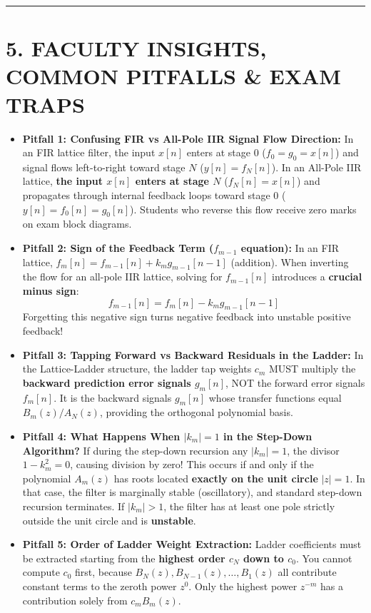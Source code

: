 \documentclass[11pt,a4paper]{article}
\begin{document}
\noindent\rule{\textwidth}{0.5pt}

\section{5. FACULTY INSIGHTS, COMMON PITFALLS \& EXAM TRAPS}

\begin{itemize}
    \item \textbf{Pitfall 1: Confusing FIR vs All-Pole IIR Signal Flow Direction:}
    In an FIR lattice filter, the input $x[n]$ enters at stage 0 ($f_0 = g_0 = x[n]$) and signal flows left-to-right toward stage $N$ ($y[n] = f_N[n]$). In an All-Pole IIR lattice, \textbf{the input $x[n]$ enters at stage $N$} ($f_N[n] = x[n]$) and propagates through internal feedback loops toward stage 0 ($y[n] = f_0[n] = g_0[n]$). Students who reverse this flow receive zero marks on exam block diagrams.
    
    \item \textbf{Pitfall 2: Sign of the Feedback Term ($f_{m-1}$ equation):}
    In an FIR lattice, $f_m[n] = f_{m-1}[n] + k_m g_{m-1}[n-1]$ (addition). When inverting the flow for an all-pole IIR lattice, solving for $f_{m-1}[n]$ introduces a \textbf{crucial minus sign}:
    \begin{equation}
    f_{m-1}[n] = f_m[n] - k_m g_{m-1}[n-1]
    \end{equation}
    Forgetting this negative sign turns negative feedback into unstable positive feedback!
    
    \item \textbf{Pitfall 3: Tapping Forward vs Backward Residuals in the Ladder:}
    In the Lattice-Ladder structure, the ladder tap weights $c_m$ MUST multiply the \textbf{backward prediction error signals $g_m[n]$}, NOT the forward error signals $f_m[n]$. It is the backward signals $g_m[n]$ whose transfer functions equal $B_m(z)/A_N(z)$, providing the orthogonal polynomial basis.
    
    \item \textbf{Pitfall 4: What Happens When $|k_m| = 1$ in the Step-Down Algorithm?}
    If during the step-down recursion any $|k_m| = 1$, the divisor $1 - k_m^2 = 0$, causing division by zero! This occurs if and only if the polynomial $A_m(z)$ has roots located \textbf{exactly on the unit circle} $|z| = 1$. In that case, the filter is marginally stable (oscillatory), and standard step-down recursion terminates. If $|k_m| > 1$, the filter has at least one pole strictly outside the unit circle and is \textbf{unstable}.
    
    \item \textbf{Pitfall 5: Order of Ladder Weight Extraction:}
    Ladder coefficients must be extracted starting from the \textbf{highest order $c_N$ down to $c_0$}. You cannot compute $c_0$ first, because $B_N(z), B_{N-1}(z), \dots, B_1(z)$ all contribute constant terms to the zeroth power $z^0$. Only the highest power $z^{-m}$ has a contribution solely from $c_m B_m(z)$.
\end{itemize}
\end{document}

